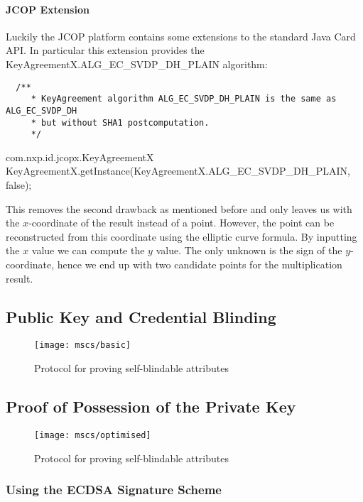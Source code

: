 \paragraph{JCOP Extension}

Luckily the JCOP platform contains some extensions to the standard Java Card API.
In particular this extension provides the KeyAgreementX.ALG\_EC\_SVDP\_DH\_PLAIN algorithm:

\begin{lstlisting}
  /**
	 * KeyAgreement algorithm ALG_EC_SVDP_DH_PLAIN is the same as ALG_EC_SVDP_DH
	 * but without SHA1 postcomputation.
	 */
\end{lstlisting}

com.nxp.id.jcopx.KeyAgreementX
KeyAgreementX.getInstance(KeyAgreementX.ALG\_EC\_SVDP\_DH\_PLAIN, false);

This removes the second drawback as mentioned before and only leaves us with the
$x$-coordinate of the result instead of a point. However, the point can be reconstructed
from this coordinate using the elliptic curve formula. By inputting the $x$ value
we can compute the $y$ value. The only unknown is the sign of the $y$-coordinate,
hence we end up with two candidate points for the multiplication result.

\subsection{Public Key and Credential Blinding}

\begin{figure}
  \centering
  \texttt{[image: mscs/basic]}
  \caption{Protocol for proving self-blindable attributes}\label{fig:basic}
\end{figure}

\subsection{Proof of Possession of the Private Key}

\begin{figure}
  \centering
  \texttt{[image: mscs/optimised]}
  \caption{Protocol for proving self-blindable attributes}\label{fig:optimised}
\end{figure}

\subsubsection{Using the ECDSA Signature Scheme}

